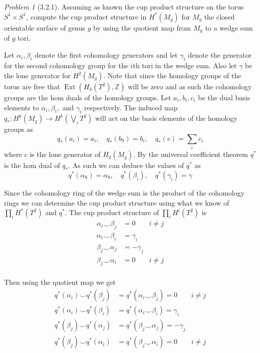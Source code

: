 \documentclass[10pt]{article}
\newcommand{\bb}[1]{\mathbb{#1}}
\DeclareMathOperator{\Ext}{Ext}
\theoremstyle{remark}
\newtheorem{problem}{Problem}
\begin{document}
\begin{problem}[3.2.1]
  Assuming as known the cup product structure on the torus $S^1\times S^1$,
  compute the cup product structure in $H^*(M_g)$ for $M_g$ the closed
  orientable surface of genus $g$ by using the quotient map from $M_g$
  to a wedge sum of $g$ tori.
\end{problem}

Let $\alpha_i,\beta_i$ denote the first cohomology generators and
let $\gamma_i$ denote the generator for the second cohomology group for the $i$th
tori in the wedge sum. Also let $\gamma$ be the lone generator for $H^2(M_g)$.
Note that since the homology groups of the torus are
free that $\Ext(H_k(T^2),\bb{Z})$ will be zero and as such the cohomology groups are the hom duals
of the homology groups. Let $a_i,b_i,c_i$ be the dual basis elements to $\alpha_i,\beta_i,$ and
$\gamma_i$ respectively. The induced map $q_*:H^k(M_g)\rightarrow H^k(\bigvee_i T^2)$ will act on the basis elements of
the homology groups as
\[
  q_*(a_i)=a_i,\quad q_*(b_9)=b_i,\quad q_*(c)=\sum_i c_i
\]
where $c$ is the lone generator of $H_2(M_g)$. By the universal coefficient theorem
$q^*$ is the hom dual of $q_*$. As such we can deduce the values of $q^*$ as
\[
  q^*(\alpha_8)=\alpha_8,\quad q^*(\beta_i),\quad q^*(\gamma_i)= \gamma
\]

Since the cohomology ring of the wedge sum is the product of the cohomology rings
we can determine the cup product structure using what we know of $\prod_i H^*(T^2)$ and
$q^*$. The cup product structure of $\prod_i H^i(T^2)$ is
\begin{align*}
  \alpha_i\smile \beta_j &= 0 & i\neq j\\
  \alpha_i\smile \beta_i &= \gamma_i\\
  \beta_j\smile \alpha_j &= -\gamma_j\\
  \beta_j\smile \alpha_i &= 0 & i\neq j\\
\end{align*}

Then using the quotient map we get
\begin{align*}
  q^*(\alpha_i)\smile q^*(\beta_j) &= q^*(\alpha_i\smile\beta_j) = 0 & i\neq j\\
  q^*(\alpha_i)\smile q^*(\beta_i) &= q^*(\alpha_i\smile\beta_i) = \gamma_i\\
  q^*(\beta_j)\smile q^*(\alpha_j) &= q^*(\beta_j\smile\alpha_j)= -\gamma_j\\
  q^*(\beta_j)\smile q^*(\alpha_i) &= q^*(\beta_j\smile\alpha_i) = 0 & i\neq j\\
\end{align*}
\end{document}
